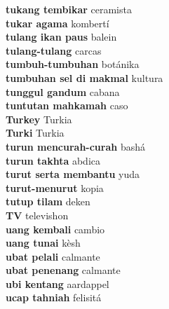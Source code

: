 \textbf{ tukang tembikar  } ceramista \\
\textbf{ tukar agama  } kombertí \\
\textbf{ tulang ikan paus  } balein \\
\textbf{ tulang-tulang  } carcas \\
\textbf{ tumbuh-tumbuhan  } botánika \\
\textbf{ tumbuhan sel di makmal  } kultura \\
\textbf{ tunggul gandum  } cabana \\
\textbf{ tuntutan mahkamah  } caso \\
\textbf{ Turkey  } Turkia \\
\textbf{ Turki  } Turkia \\
\textbf{ turun mencurah-curah  } bashá \\
\textbf{ turun takhta  } abdica \\
\textbf{ turut serta membantu  } yuda \\
\textbf{ turut-menurut  } kopia \\
\textbf{ tutup tilam  } deken \\
\textbf{ TV  } televishon \\
\textbf{ uang kembali  } cambio \\
\textbf{ uang tunai  } kèsh \\
\textbf{ ubat pelali  } calmante \\
\textbf{ ubat penenang  } calmante \\
\textbf{ ubi kentang  } aardappel \\
\textbf{ ucap tahniah  } felisitá \\
